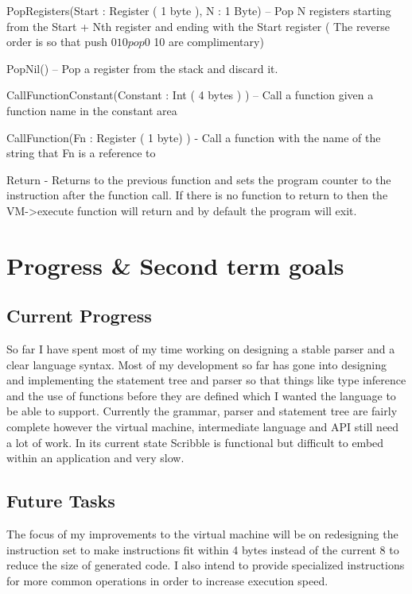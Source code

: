 \documentclass[]{final_report}
\begin{document}
PopRegisters(Start : Register ( 1 byte ), N : 1 Byte) – Pop N registers starting from the Start + Nth
register and ending with the Start register ( The reverse order is so that push $0 10 pop $0 10 are
complimentary)

PopNil() – Pop a register from the stack and discard it.

CallFunctionConstant(Constant : Int ( 4 bytes ) ) – Call a function given a function name in the
constant area

CallFunction(Fn : Register ( 1 byte) ) - Call a function with the name of the string that Fn is a
reference to

Return - Returns to the previous function and sets the program counter to the instruction after the
function call. If there is no function to return to then the VM-\textgreater execute function will return and by default the program will exit.

\chapter{Progress \& Second term goals}

\section { Current Progress }

So far I have spent most of my time working on designing a stable parser and a clear language syntax. Most of my development so far has gone into designing and implementing the statement tree and parser so that things like type inference and the use of functions before they are defined which I wanted the language to be able to support. Currently the grammar, parser and statement tree are fairly complete however the virtual machine, intermediate language and API still need a lot of work. In its current state Scribble is functional but difficult to embed within an application and very slow.

\section { Future Tasks }

The focus of my improvements to the virtual machine will be on redesigning the instruction set to make instructions fit within 4 bytes instead of the current 8 to reduce the size of generated code. I also intend to provide specialized instructions for more common operations in order to increase execution speed.
\end{document}
